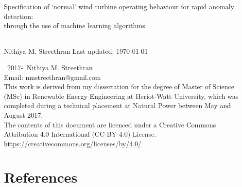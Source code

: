 \documentclass[twoside,12pt,openany]{book}
\def\theauthor{Nithiya M. Streethran}
\def\thetitle{%
  Specification of \texorpdfstring{`}{'}normal' wind turbine operating
  behaviour for rapid anomaly detection:\texorpdfstring{\\}{}
  through the use of machine learning algorithms%
}
\begin{document}

\frontmatter

\begin{titlepage}
  \hspace{0pt}\vfill %
  \centering %
  \Large\thetitle
  \\[4cm]
  \large\theauthor
  \vfill
  Last updated: \today
  \vfill\hspace{0pt} %
\end{titlepage}

{\setlength{\parindent}{0pt}
\hspace{0pt}\vfill
\textcopyright~2017-\the\year{}~\theauthor
\\[.5cm]
Email: nmstreethran@gmail.com
\\[.5cm]
This work is derived from my dissertation for the degree of Master of Science
(MSc) in Renewable Energy Engineering at Heriot-Watt University, which was
completed during a technical placement at Natural Power between May and
August 2017.
\\[.5cm]
The contents of this document are licenced under a
Creative Commons Attribution 4.0 International (CC-BY-4.0) License. \\
\url{https://creativecommons.org/licenses/by/4.0/}
\vfill\hspace{0pt}
}

\onehalfspacing



\tableofcontents
\listoffigures
\listoftables



\themainmatter







{%
  \backmatter%
  \chapter{References}%
  \printbibliography[heading=none]%
}

\theappendix


\end{document}
